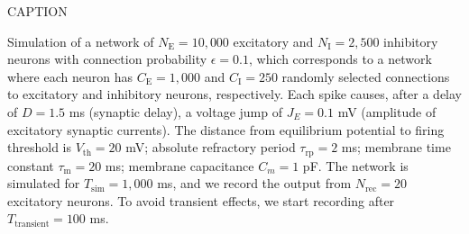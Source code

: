 CAPTION

Simulation of a network of $N_\mathrm{E}=10,000$ excitatory and $N_\mathrm{I} = 2,500$ inhibitory neurons with connection probability $\epsilon = 0.1$, which corresponds to a network where each neuron has $C_\mathrm{E}=1,000$ and $C_\mathrm{I}=250$ randomly selected connections to excitatory and inhibitory neurons, respectively. Each spike causes, after a delay of $D=1.5$ ms (synaptic delay), a voltage jump of $J_E = 0.1$ mV (amplitude of excitatory synaptic currents). The distance from equilibrium potential to firing threshold is $V_\mathrm{th} = 20$ mV; absolute refractory period $\tau_\mathrm{rp} = 2$ ms; membrane time constant $\tau_\mathrm{m}=20$ ms; membrane capacitance $C_m = 1$ pF. The network is simulated for $T_\mathrm{sim} = 1,000$ ms, and we record the output from $N_\mathrm{rec} = 20$ excitatory neurons. To avoid transient effects, we start recording after $T_\mathrm{transient} = 100$ ms. 